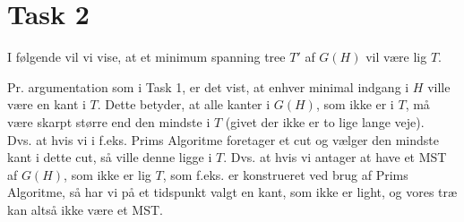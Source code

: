 \section{Task 2}

I følgende vil vi vise, at et minimum spanning tree $T'$ af $G(H)$ vil være lig $T$.

Pr. argumentation som i Task 1, er det vist, at enhver minimal indgang i $H$ ville være en kant i $T$. Dette betyder, at alle kanter i $G(H)$, som ikke er i $T$, må være skarpt større end den mindste i $T$ (givet der ikke er to lige lange veje).\\
Dvs. at hvis vi i f.eks. Prims Algoritme foretager et cut og vælger den mindste kant i dette cut, så ville denne ligge i $T$.
Dvs. at hvis vi antager at have et MST af $G(H)$, som ikke er lig $T$, som f.eks. er konstrueret ved brug af Prims Algoritme, så har vi på et tidspunkt valgt en kant, som ikke er light, og vores træ kan altså ikke være et MST. 
